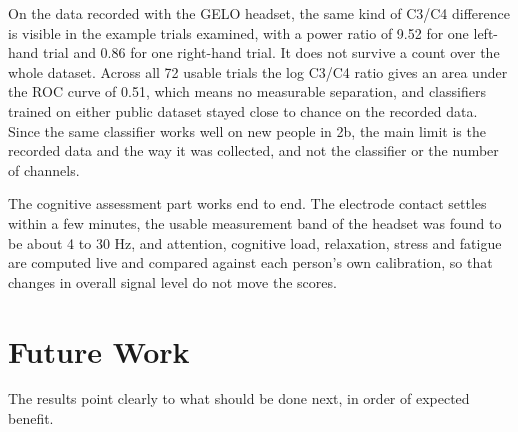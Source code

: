 On the data recorded with the GELO headset, the same kind of C3/C4 difference is visible in
the example trials examined, with a power ratio of 9.52 for one left-hand trial and 0.86
for one right-hand trial. It does not survive a count over the whole dataset. Across all
72 usable trials the log C3/C4 ratio gives an area under the ROC curve of 0.51, which
means no measurable separation, and classifiers trained on either public dataset stayed
close to chance on the recorded data. Since the same classifier works well on new people in
2b, the main limit is the recorded data and the way it was collected, and not the
classifier or the number of channels.

The cognitive assessment part works end to end. The electrode contact settles within a few
minutes, the usable measurement band of the headset was found to be about 4 to 30 Hz, and
attention, cognitive load, relaxation, stress and fatigue are computed live and compared
against each person's own calibration, so that changes in overall signal level do not
move the scores.

\section{Future Work}

The results point clearly to what should be done next, in order of expected benefit.

